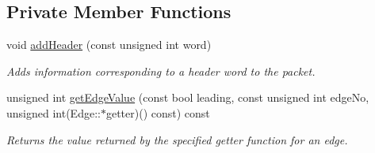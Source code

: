 \subsection*{Private Member Functions}
\begin{DoxyCompactItemize}
\item 
void \hyperlink{class_packet_a7f710ea08bf8d264beb1361f19cc3afb}{add\+Header} (const unsigned int word)
\begin{DoxyCompactList}\small\item\em Adds information corresponding to a header word to the packet. \end{DoxyCompactList}\item 
unsigned int \hyperlink{class_packet_af3abe7485b62e417e83b11c8891ba7a6}{get\+Edge\+Value} (const bool leading, const unsigned int edge\+No, unsigned int(Edge\+::$\ast$getter)() const) const
\begin{DoxyCompactList}\small\item\em Returns the value returned by the specified getter function for an edge. \end{DoxyCompactList}\end{DoxyCompactItemize}
